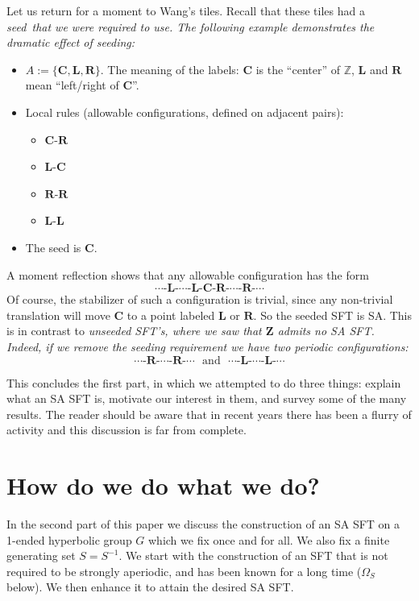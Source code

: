 \documentclass[12pt,reqno]{amsart}
\theoremstyle{plain}
\theoremstyle{definition}
\numberwithin{subcase}{case}
\theoremstyle{plain}
\theoremstyle{definition}
\begin{document}
Let us return for a moment to Wang's tiles. Recall that these tiles had a \em seed\em\ that we were required to use. The following example demonstrates the dramatic effect of seeding: 
\begin{itemize}
\item \(A := \{\mathbf{C},\mathbf{L},\mathbf{R}\}\). The meaning of the labels: \(\mathbf{C}\) is the ``center'' of \(\mathbb{Z}\), \(\mathbf{L}\) and \(\mathbf{R}\) mean ``left/right of \(\mathbf{C}\)''.
\item Local rules (allowable configurations, defined on adjacent pairs):
	\begin{itemize}
	\item \(\mathbf{C}\)-\(\mathbf{R}\)
	\item \(\mathbf{L}\)-\(\mathbf{C}\)
	\item \(\mathbf{R}\)-\(\mathbf{R}\)
	\item \(\mathbf{L}\)-\(\mathbf{L}\)
	\end{itemize}
\item The seed is \(\mathbf{C}\). 
\end{itemize}
A moment reflection shows that any allowable configuration has the form
\[
\cdots\textrm{-}
\mathbf{L}\textrm{-}\cdots\textrm{-}\mathbf{L}
\textrm{-}\mathbf{C}\textrm{-}
\mathbf{R}\textrm{-}\cdots\textrm{-}\mathbf{R}
\textrm{-}\cdots
\]
Of course, the stabilizer of such a configuration is trivial, since any non-trivial translation will move \(\mathbf{C}\) to a point labeled \(\mathbf{L}\) or \(\mathbf{R}\). So the seeded SFT is SA. This is in contrast to \em unseeded \em SFT's, where we saw that \(\mathbf{Z}\) admits no SA SFT. Indeed, if we remove the seeding requirement we have two periodic configurations:
\[
\cdots\textrm{-}
\mathbf{R}\textrm{-}\cdots\textrm{-}\mathbf{R}
\textrm{-}\cdots
\ \ \ \text{and} \ \ \
\cdots\textrm{-}
\mathbf{L} \textrm{-} \cdots \textrm{-} \mathbf{L}
\textrm{-} \cdots
\]

This concludes the first part, in which we attempted to do three things: explain what an SA SFT is, motivate our interest in them, and survey some of the many results. The reader should be aware that in recent years there has been a flurry of activity and this discussion is far from complete.










\part{How do we do what we do?}\label{part:how}
In the second part of this paper we discuss the construction of an SA SFT on a 1-ended hyperbolic group \(G\) which we fix once and for all. We also fix a finite generating set \(S = S^{-1}\).  We start with the construction of an SFT that is not required to be strongly aperiodic, and has been known for a long time (\(\Omega_{S}\) below). We then enhance it to attain the desired SA SFT. 
\end{document}
